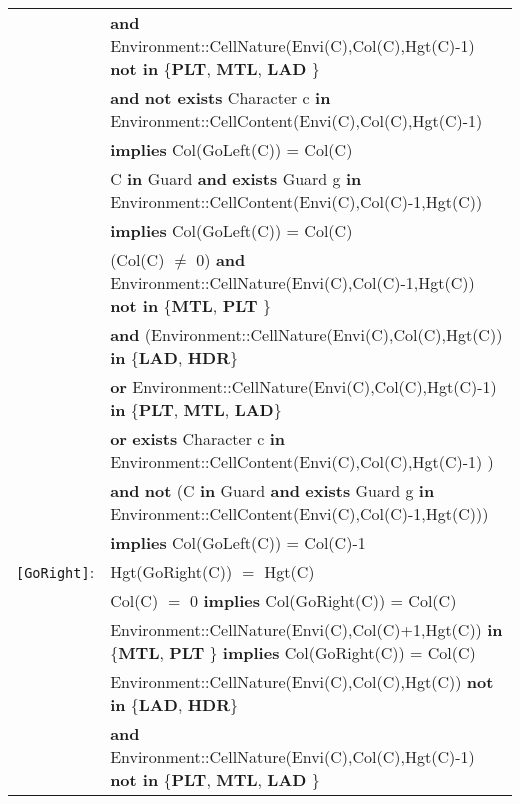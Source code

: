 \documentclass[8pt]{article}
\begin{document}
{\begin{longtable}{rl}
  \\ & \quad\quad \textbf{and} \textrm{Environment::CellNature(Envi(C),Col(C),Hgt(C)-1)} \textbf{not in} \{\textbf{PLT}, \textbf{MTL}, \textbf{LAD} \} \\
  & \quad\quad \textbf{and} \textbf{not exists} \textrm{Character} c \textbf{in} \textrm{Environment::CellContent(Envi(C),Col(C),Hgt(C)-1)} \\
  & \quad\quad \textbf{implies} \textrm{Col(GoLeft(C))} = \textrm{Col(C)} \\
  & \textrm{C} \textbf{in} \textrm{Guard} \textbf{and} \textbf{exists} \textrm{Guard} g \textbf{in} \textrm{Environment::CellContent(Envi(C),Col(C)-1,Hgt(C))} \\ & \quad\quad \textbf{implies} \textrm{Col(GoLeft(C))} = \textrm{Col(C)} \\
  & (\textrm{Col(C)} $\neq$ 0) \textbf{and} \textrm{Environment::CellNature(Envi(C),Col(C)-1,Hgt(C))} \textbf{not in} \{\textbf{MTL}, \textbf{PLT} \} \\
  & \quad\quad \textbf{and} (\textrm{Environment::CellNature(Envi(C),Col(C),Hgt(C))} \textbf{in} \{\textbf{LAD}, \textbf{HDR}\} \\
  & \quad\quad\quad\quad \textbf{or} \textrm{Environment::CellNature(Envi(C),Col(C),Hgt(C)-1)} \textbf{in} \{\textbf{PLT}, \textbf{MTL}, \textbf{LAD}\} \\
  & \quad\quad\quad\quad \textbf{or} \textbf{exists} \textrm{Character} c \textbf{in} \textrm{Environment::CellContent(Envi(C),Col(C),Hgt(C)-1)} ) \\
  & \quad\quad \textbf{and} \textbf{not} (\textrm{C} \textbf{in} \textrm{Guard} \textbf{and} \textbf{exists} \textrm{Guard} g \textbf{in} \textrm{Environment::CellContent(Envi(C),Col(C)-1,Hgt(C))}) \\
  & \quad\quad \textbf{implies} \textrm{Col(GoLeft(C))} = \textrm{Col(C)}-1 \\
\texttt{[GoRight]}: & \textrm{Hgt(GoRight(C))} $=$ \textrm{Hgt(C)} \\
  & \textrm{Col(C)} $=$ 0 \textbf{implies} \textrm{Col(GoRight(C))} = \textrm{Col(C)} \\
  & \textrm{Environment::CellNature(Envi(C),Col(C)+1,Hgt(C))} \textbf{in} \{\textbf{MTL}, \textbf{PLT} \} \textbf{implies} \textrm{Col(GoRight(C))} = \textrm{Col(C)} \\
  & \textrm{Environment::CellNature(Envi(C),Col(C),Hgt(C))} \textbf{not in} \{\textbf{LAD}, \textbf{HDR}\}
  \\ & \quad\quad \textbf{and} \textrm{Environment::CellNature(Envi(C),Col(C),Hgt(C)-1)} \textbf{not in} \{\textbf{PLT}, \textbf{MTL}, \textbf{LAD} \} \\

\end{longtable}}
\end{document}
